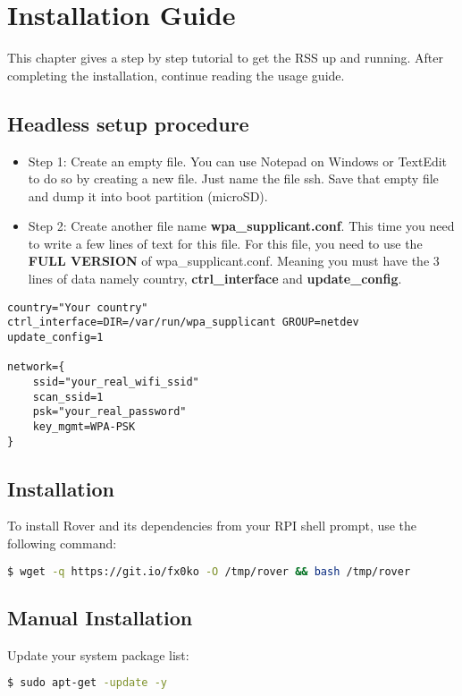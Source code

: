 \section{Installation Guide}
This chapter gives a step by step tutorial to get the RSS up and running. After completing the installation, continue reading the usage guide.

\subsection{Headless setup procedure}

\begin{itemize}
    \item Step 1: Create an empty file. You can use Notepad on Windows or TextEdit to do so by creating a new file. Just name the file ssh. Save that empty file and dump it into boot partition (microSD).
    \item Step 2: Create another file name \textbf{wpa\_supplicant.conf}. This time you need to write a few lines of text for this file. For this file, you need to use the \textbf{FULL VERSION} of wpa\_supplicant.conf. Meaning you must have the 3 lines of data namely country, \textbf{ctrl\_interface} and \textbf{update\_config}.
\end{itemize}

\begin{lstlisting}
country="Your country"
ctrl_interface=DIR=/var/run/wpa_supplicant GROUP=netdev
update_config=1

network={
    ssid="your_real_wifi_ssid"
    scan_ssid=1
    psk="your_real_password"
    key_mgmt=WPA-PSK
}
\end{lstlisting}
\newpage
\subsection{Installation}
\noindent To install Rover and its dependencies from your RPI shell prompt, use the following command:
\begin{lstlisting}[language=bash]
  $ wget -q https://git.io/fx0ko -O /tmp/rover && bash /tmp/rover
\end{lstlisting}

\subsection{Manual Installation}

Update your system package list:
\begin{lstlisting}[language=bash]
  $ sudo apt-get -update -y
\end{lstlisting}

